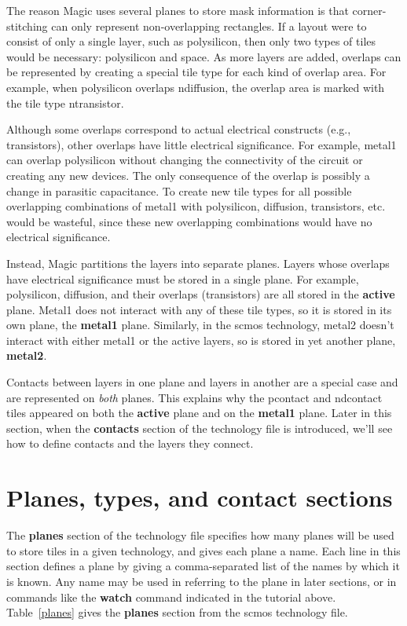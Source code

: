 \documentclass[letterpaper,twoside,12pt]{article}
\begin{document}
The reason Magic uses several planes to store mask information
is that corner-stitching can only represent non-overlapping rectangles.
If a layout were to consist of only a single layer, such
as polysilicon, then only two types of tiles would be necessary:
polysilicon and space.
As more layers are added, overlaps can be
represented by creating a special tile type for
each kind of overlap area.
For example, when polysilicon overlaps
ndiffusion, the overlap area is marked with the tile type
ntransistor.

Although some overlaps correspond to actual electrical constructs
(e.g., transistors), other overlaps have little electrical significance.
For example, metal1 can overlap polysilicon without changing the
connectivity of the circuit or creating any new devices.
The only consequence of the overlap is possibly a change in
parasitic capacitance.
To create new tile types for all possible overlapping combinations of metal1
with polysilicon, diffusion, transistors, etc.
would be wasteful, since these new overlapping combinations
would have no electrical significance.

Instead, Magic partitions the layers into separate planes.
Layers whose overlaps have electrical significance must be
stored in a single plane.
For example, polysilicon, diffusion, and their overlaps (transistors)
are all stored in the {\bfseries active} plane.
Metal1 does not interact with any of these tile types, so it is stored
in its own plane, the {\bfseries metal1} plane.
Similarly, in the scmos technology, metal2 doesn't interact with either
metal1 or the active layers, so is stored in yet another plane, {\bfseries metal2}.

Contacts between layers in one plane and layers in another are a special
case and are represented on {\itshape both} planes.
This explains why the pcontact and ndcontact
tiles appeared on both the
{\bfseries active} plane and on the {\bfseries metal1} plane.
Later in this section, when the {\bfseries contacts} section of the
technology file is introduced, we'll see how to define contacts
and the layers they connect.

\section{Planes, types, and contact sections}

The {\bfseries planes}
section of the technology file specifies how many planes will be
used to store tiles in a given technology, and gives each plane
a name.
Each line in this section
defines a plane by giving a comma-separated
list of the names by which it is known.
Any name may be used in referring to the plane in later
sections, or in commands like the
{\bfseries *watch} command indicated in the tutorial above.
Table~\ref{planes} gives the {\bfseries planes} section from the
scmos technology file.
\end{document}
